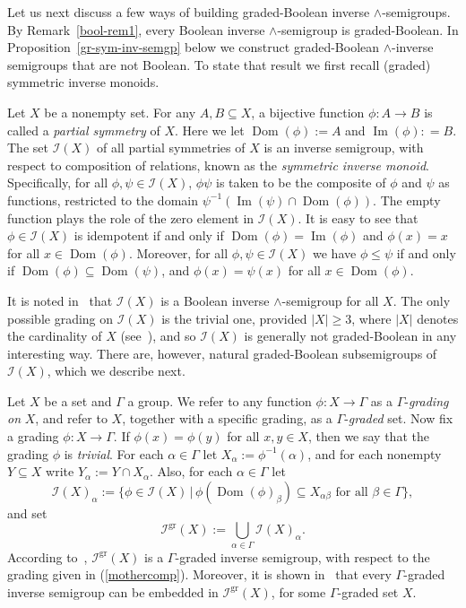 \documentclass[a4paper,reqno,12pt]{amsart}
\numberwithin{equation}{section}
\theoremstyle{plain}
\theoremstyle{definition}
\newcommand{\im}{\operatorname{Im}}
\newcommand{\dom}{\operatorname{Dom}}
\newcommand{\gr}{\operatorname{gr}}
\begin{document}
Let us next discuss a few ways of building graded-Boolean inverse $\land$-semigroups. By Remark~\ref{bool-rem1}, every Boolean inverse $\land$-semigroup is graded-Boolean. In Proposition~\ref{gr-sym-inv-semgp} below we construct graded-Boolean $\land$-inverse semigroups that are not Boolean. To state that result we first recall (graded) symmetric inverse monoids.

Let $X$ be a nonempty set. For any $A,B \subseteq X$, a bijective function $\phi: A\rightarrow B$ is called a \emph{partial symmetry} of $X$. Here we let $\dom(\phi):=A$ and $\im(\phi): = B$. The set $\mathcal{I}(X)$ of all partial symmetries of $X$ is an inverse semigroup, with respect to composition of relations, known as the \emph{symmetric inverse monoid}. Specifically, for all $\phi,\psi \in \mathcal{I}(X)$, $\phi \psi$ is taken to be the composite of $\phi$ and $\psi$ as functions, restricted to the domain $\psi^{-1}(\im(\psi)\cap \dom(\phi))$. The empty function plays the role of the zero element in $\mathcal{I}(X)$. It is easy to see that $\phi \in \mathcal{I}(X)$ is idempotent if and only if $\dom(\phi)=\im(\phi)$ and $\phi(x) = x$ for all $x \in \dom(\phi)$. Moreover, for all $\phi, \psi \in \mathcal{I}(X)$ we have  $\phi \leq \psi$ if and only if $\dom(\phi) \subseteq \dom(\psi)$, and $\phi(x)=\psi(x)$ for all $x \in \dom(\phi)$. 

It is noted in~\cite[Example 2.25]{Lawson2} that $\mathcal{I}(X)$ is a Boolean inverse $\land$-semigroup for all $X$. The only possible grading on $\mathcal{I}(X)$ is the trivial one, provided $|X| \geq 3$, where $|X|$ denotes the cardinality of $X$ (see~\cite[Proposition 5.1]{RZ}), and so $\mathcal{I}(X)$ is generally not graded-Boolean in any interesting way. There are, however, natural graded-Boolean subsemigroups of $\mathcal{I}(X)$, which we describe next.

Let $X$ be a set and $\Gamma$ a group. We refer to any function $\phi: X \to \Gamma$ as a $\Gamma$-\emph{grading on} $X$, and refer to $X$, together with a specific grading, as a $\Gamma$-\emph{graded} set. Now fix a grading $\phi: X \to \Gamma$. If $\phi(x) = \phi(y)$ for all $x,y \in X$, then we say that the grading $\phi$ is \emph{trivial}. For each $\alpha \in \Gamma$ let $X_{\alpha} := \phi^{-1}(\alpha)$, and for each nonempty $Y \subseteq X$ write $Y_\alpha:= Y\cap X_\alpha$. Also, for each $\alpha \in \Gamma$ let 
\begin{equation}\label{mothercomp} 
\mathcal{I}(X)_{\alpha}:= \big \{\phi \in \mathcal{I}(X) \, \big \vert \, \phi(\dom(\phi)_{\beta}) \subseteq X_{\alpha\beta} \text{ for all } \beta \in \Gamma \big \}, 
\end{equation} 
and set 
\begin{equation}\label{mothersemigroup} 
\mathcal{I}^{\gr}(X):= \bigcup _{\alpha \in \Gamma} \mathcal{I}(X)_{\alpha}. 
\end{equation} 
According to~\cite[Proposition 5.3]{RZ}, $\mathcal{I}^{\gr}(X)$ is a $\Gamma$-graded inverse semigroup, with respect to the grading given in (\ref{mothercomp}). Moreover, it is shown in~\cite[Proposition 5.4]{RZ} that every $\Gamma$-graded inverse semigroup can be embedded in $\mathcal{I}^{\gr}(X)$, for some $\Gamma$-graded set $X$.
\end{document}

